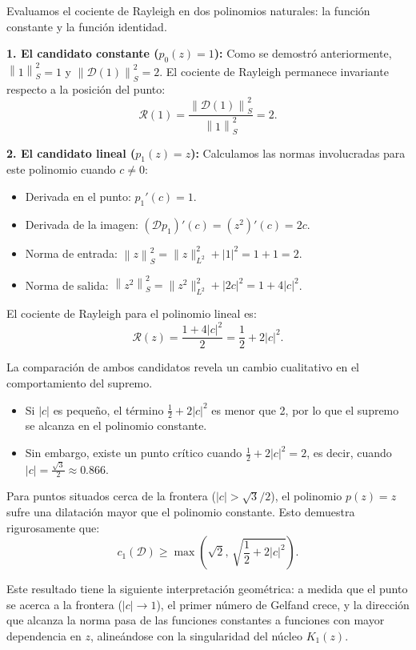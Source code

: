 \documentclass[12pt,a4paper]{article}
\theoremstyle{definition}
\theoremstyle{remark}
\newcommand{\norm}[1]{\left\| #1 \right\|_S}
\newcommand{\abs}[1]{\left| #1 \right|}
\newcommand{\D}{\mathcal{D}}
\begin{document}
Evaluamos el cociente de Rayleigh en dos polinomios naturales: la función constante y la función identidad.

\textbf{1. El candidato constante ($p_0(z) = 1$):}
Como se demostró anteriormente, $\norm{1}^2 = 1$ y $\norm{\D(1)}^2 = 2$. El cociente de Rayleigh permanece invariante respecto a la posición del punto:
$$ \mathcal{R}(1) = \frac{\norm{\D(1)}^2}{\norm{1}^2} = 2. $$

\textbf{2. El candidato lineal ($p_1(z) = z$):}
Calculamos las normas involucradas para este polinomio cuando $c \neq 0$:
\begin{itemize}
    \item Derivada en el punto: $p_1'(c) = 1$.
    \item Derivada de la imagen: $(\D p_1)'(c) = (z^2)'(c) = 2c$.
    \item Norma de entrada: $\norm{z}^2 = \|z\|_{L^2}^2 + \abs{1}^2 = 1 + 1 = 2$.
    \item Norma de salida: $\norm{z^2}^2 = \|z^2\|_{L^2}^2 + \abs{2c}^2 = 1 + 4\abs{c}^2$.
\end{itemize}
El cociente de Rayleigh para el polinomio lineal es:
$$ \mathcal{R}(z) = \frac{1 + 4\abs{c}^2}{2} = \frac{1}{2} + 2\abs{c}^2. $$

La comparación de ambos candidatos revela un cambio cualitativo en el comportamiento del supremo.
\begin{itemize}
    \item Si $\abs{c}$ es pequeño, el término $\frac{1}{2} + 2\abs{c}^2$ es menor que 2, por lo que el supremo se alcanza en el polinomio constante.
    \item Sin embargo, existe un punto crítico cuando $\frac{1}{2} + 2\abs{c}^2 = 2$, es decir, cuando $\abs{c} = \frac{\sqrt{3}}{2} \approx 0.866$.
\end{itemize}

Para puntos situados cerca de la frontera ($|c| > \sqrt{3}/2$), el polinomio $p(z)=z$ sufre una dilatación mayor que el polinomio constante. Esto demuestra rigurosamente que:
\begin{equation}
    c_1(\D) \ge \max \left( \sqrt{2}, \, \sqrt{\frac{1}{2} + 2\abs{c}^2} \right).
\end{equation}

Este resultado tiene la siguiente interpretación geométrica: a medida que el punto se acerca a la frontera ($|c| \to 1$), el primer número de Gelfand crece, y la dirección que alcanza la norma pasa de las funciones constantes a funciones con mayor dependencia en $z$, alineándose con la singularidad del núcleo $K_1(z)$.
\end{document}
